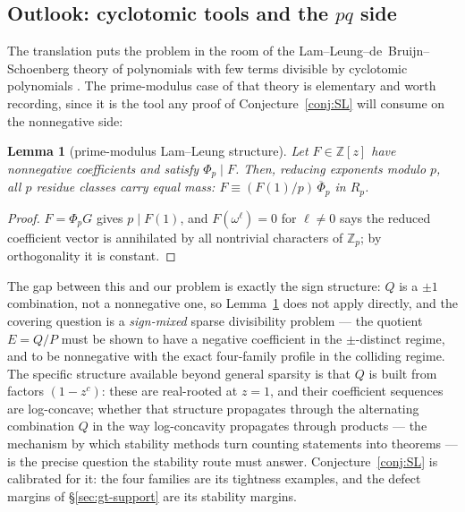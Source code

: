 \documentclass[11pt,a4paper]{article}
\numberwithin{equation}{section}
\theoremstyle{plain}
\newtheorem{lemma}[theorem]{Lemma}
\theoremstyle{definition}
\theoremstyle{remark}
\newcommand{\Z}{\mathbb{Z}}
\begin{document}
\subsection{Outlook: cyclotomic tools and the $pq$ side}\label{sec:gt-outlook}

The translation puts the problem in the room of the
Lam--Leung--de~Bruijn--Schoenberg theory of polynomials with few terms
divisible by cyclotomic polynomials
\cite{deBruijnSchoenberg,LamLeung}. The prime-modulus case of that theory is
elementary and worth recording, since it is the tool any proof of
Conjecture~\ref{conj:SL} will consume on the nonnegative side:

\begin{lemma}[prime-modulus Lam--Leung structure]\label{lem:LL}
Let $F\in\Z[z]$ have nonnegative coefficients and satisfy $\Phi_p\mid F$.
Then, reducing exponents modulo $p$, all $p$ residue classes carry equal
mass: $F\equiv(F(1)/p)\,\overline\Phi_p$ in $R_p$.
\end{lemma}

\begin{proof}
$F=\Phi_pG$ gives $p\mid F(1)$, and $F(\omega^\ell)=0$ for $\ell\ne0$ says
the reduced coefficient vector is annihilated by all nontrivial characters
of $\Z_p$; by orthogonality it is constant.
\end{proof}

The gap between this and our problem is exactly the sign structure: $Q$ is
a $\pm1$ combination, not a nonnegative one, so Lemma~\ref{lem:LL} does not
apply directly, and the covering question is a \emph{sign-mixed} sparse
divisibility problem --- the quotient $E=Q/P$ must be shown to have a
negative coefficient in the $\pm$-distinct regime, and to be nonnegative
with the exact four-family profile in the colliding regime. The specific
structure available beyond general sparsity is that $Q$ is built from
factors $(1-z^{c})$: these are real-rooted at $z=1$, and their coefficient
sequences are log-concave; whether that structure propagates through the
alternating combination $Q$ in the way log-concavity propagates through
products --- the mechanism by which stability methods turn counting
statements into theorems \cite{BrandenHuh} --- is the precise question the
stability route must answer. Conjecture~\ref{conj:SL} is calibrated for it:
the four families are its tightness examples, and the defect margins of
\S\ref{sec:gt-support} are its stability margins.
\end{document}
